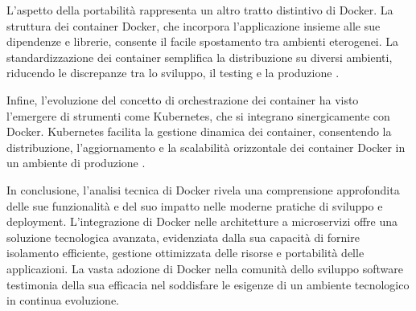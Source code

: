 L'aspetto della portabilità rappresenta un altro tratto distintivo di Docker. La struttura dei container Docker, che incorpora l'applicazione insieme alle sue dipendenze e librerie, consente il facile spostamento tra ambienti eterogenei. La standardizzazione dei container semplifica la distribuzione su diversi ambienti, riducendo le discrepanze tra lo sviluppo, il testing e la produzione \cite{turnbull2014docker}.

Infine, l'evoluzione del concetto di orchestrazione dei container ha visto l'emergere di strumenti come Kubernetes, che si integrano sinergicamente con Docker. Kubernetes facilita la gestione dinamica dei container, consentendo la distribuzione, l'aggiornamento e la scalabilità orizzontale dei container Docker in un ambiente di produzione \cite{burns2016borg}.

In conclusione, l'analisi tecnica di Docker rivela una comprensione approfondita delle sue funzionalità e del suo impatto nelle moderne pratiche di sviluppo e deployment. L'integrazione di Docker nelle architetture a microservizi offre una soluzione tecnologica avanzata, evidenziata dalla sua capacità di fornire isolamento efficiente, gestione ottimizzata delle risorse e portabilità delle applicazioni. La vasta adozione di Docker nella comunità dello sviluppo software testimonia della sua efficacia nel soddisfare le esigenze di un ambiente tecnologico in continua evoluzione.
